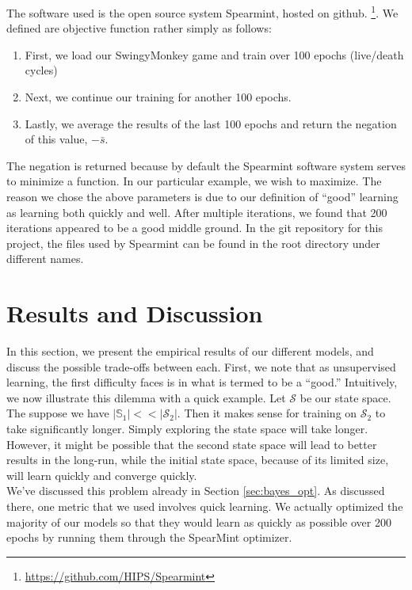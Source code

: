 \documentclass[letterpaper]{article}
\begin{document}
The software used is the open source system Spearmint, hosted on github. \footnote{\href{https://github.com/HIPS/Spearmint}{https://github.com/HIPS/Spearmint}}. We defined are objective function rather simply as follows:
\begin{enumerate}
\item First, we load our SwingyMonkey game and train over 100 epochs (live/death cycles)
\item Next, we continue our training for another 100 epochs. 
\item Lastly, we average the results of the last 100 epochs and return the negation of this value, $-\bar{s}$.
\end{enumerate}
The negation is returned because by default the Spearmint software system serves to minimize a function. In our particular example, we wish to maximize. The reason we chose the above parameters is due to our definition of ``good'' learning as learning both quickly and well. After multiple iterations, we found that 200 iterations appeared to be a good middle ground. In the git repository for this project, the files used by Spearmint can be found in the root directory under different names.


\section{Results and Discussion}
\label{sec:results_and_discussion}
In this section, we present the empirical results of our different models, and discuss the possible trade-offs between each. First, we note that as unsupervised learning, the first difficulty faces is in what is termed to be a ``good.'' Intuitively, we now illustrate this dilemma with a quick example. Let $\mathcal{S}$ be our state space. The suppose we have $|\mathbb{S}_1| << |\mathcal{S}_2|$. Then it makes sense for training on $\mathcal{S}_2$ to take significantly longer. Simply exploring the state space will take longer. However, it might be possible that the second state space will lead to better results in the long-run, while the initial state space, because of its limited size, will learn quickly and converge quickly.\\

We've discussed this problem already in Section \ref{sec:bayes_opt}. As discussed there, one metric that we used involves quick learning. We actually optimized the majority of our models so that they would learn as quickly as possible over 200 epochs by running them through the SpearMint optimizer. \\
\end{document}
